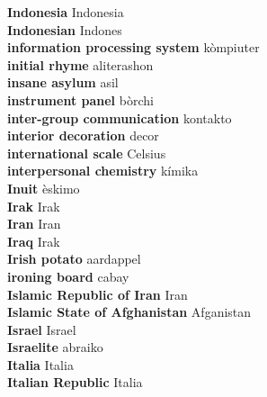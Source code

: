 \textbf{ Indonesia  } Indonesia \\
\textbf{ Indonesian  } Indones \\
\textbf{ information processing system  } kòmpiuter \\
\textbf{ initial rhyme  } aliterashon \\
\textbf{ insane asylum  } asil \\
\textbf{ instrument panel  } bòrchi \\
\textbf{ inter-group communication  } kontakto \\
\textbf{ interior decoration  } decor \\
\textbf{ international scale  } Celsius \\
\textbf{ interpersonal chemistry  } kímika \\
\textbf{ Inuit  } èskimo \\
\textbf{ Irak  } Irak \\
\textbf{ Iran  } Iran \\
\textbf{ Iraq  } Irak \\
\textbf{ Irish potato  } aardappel \\
\textbf{ ironing board  } cabay \\
\textbf{ Islamic Republic of Iran  } Iran \\
\textbf{ Islamic State of Afghanistan  } Afganistan \\
\textbf{ Israel  } Israel \\
\textbf{ Israelite  } abraiko \\
\textbf{ Italia  } Italia \\
\textbf{ Italian Republic  } Italia \\
